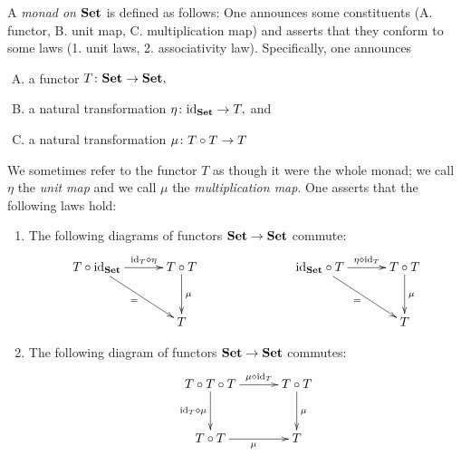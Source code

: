 \documentclass[CT4S-EN-RU]{subfiles}
\begin{document}
\begin{blockRUS}
\end{blockRUS}

\begin{definitionENG}[Monad]\label{def:monad}
A {\em monad on ${\mathbf{Set}}$} is defined as follows: One announces some constituents (A. functor, B. unit map, C. multiplication map) and asserts that they conform to some laws (1. unit laws, 2. associativity law). Specifically, one announces
\begin{enumerate}[A.]
\item a functor $T\colon{\mathbf{Set}}\rightarrow{\mathbf{Set}},$
\item a natural transformation $\eta\colon\textnormal{id}_{{\mathbf{Set}}}\rightarrow T,$ and 
\item a natural transformation $\mu\colon T\circ T\rightarrow T$
\end{enumerate}
We sometimes refer to the functor $T$ as though it were the whole monad; we call $\eta$ the {\em unit map} and we call $\mu$ the {\em multiplication map}. One asserts that the following laws hold:
\begin{enumerate}[1.]
\item The following diagrams of functors ${\mathbf{Set}}\rightarrow{\mathbf{Set}}$ commute:
\begin{align*}
\xymatrix@=30pt{T\circ\id_\Set\ar[r]^-{\id_T\diamond\eta}\ar[dr]_{=}&T\circ T\ar[d]^\mu\\&T}\hspace{1in}
\xymatrix@=30pt{\id_\Set\circ T\ar[r]^-{\eta\diamond\id_T}\ar[dr]_=&T\circ T\ar[d]^\mu\\&T}
\end{align*}
\item The following diagram of functors ${\mathbf{Set}}\rightarrow{\mathbf{Set}}$ commutes:
\begin{align*}
\xymatrix@=30pt{T\circ T\circ T\ar[r]^-{\mu\diamond\id_T}\ar[d]_-{\id_T\diamond\mu}&T\circ T\ar[d]^\mu\\T\circ T\ar[r]_\mu&T}\end{align*}
\end{enumerate}
\end{definitionENG}

\begin{definitionRUS}[Monad]\label{def:monad}
\end{definitionRUS}
\end{document}
